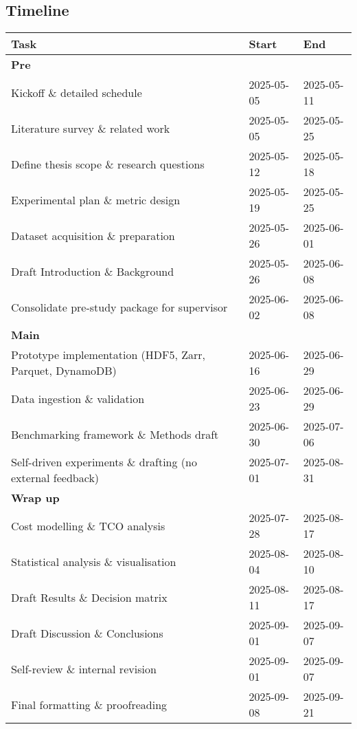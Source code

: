 \documentclass{article}
\begin{document}
\subsection{Timeline}
\begin{center}
\begingroup
\setlength{\tabcolsep}{8pt}
\small
\begin{tabular}{@{}lll@{}}
\toprule
\textbf{Task} & \textbf{Start} & \textbf{End} \\
\midrule
\multicolumn{3}{l}{\textbf{Pre}} \\
Kickoff \& detailed schedule & 2025-05-05 & 2025-05-11 \\
Literature survey \& related work & 2025-05-05 & 2025-05-25 \\
Define thesis scope \& research questions & 2025-05-12 & 2025-05-18 \\
Experimental plan \& metric design & 2025-05-19 & 2025-05-25 \\
Dataset acquisition \& preparation & 2025-05-26 & 2025-06-01 \\
Draft Introduction \& Background & 2025-05-26 & 2025-06-08 \\
Consolidate pre-study package for supervisor & 2025-06-02 & 2025-06-08 \\
\midrule
\multicolumn{3}{l}{\textbf{Main}} \\
Prototype implementation (HDF5, Zarr, Parquet, DynamoDB) & 2025-06-16 & 2025-06-29 \\
Data ingestion \& validation & 2025-06-23 & 2025-06-29 \\
Benchmarking framework \& Methods draft & 2025-06-30 & 2025-07-06 \\
Self-driven experiments \& drafting (no external feedback) & 2025-07-01 & 2025-08-31 \\
\midrule
\multicolumn{3}{l}{\textbf{Wrap up}} \\
Cost modelling \& TCO analysis & 2025-07-28 & 2025-08-17 \\
Statistical analysis \& visualisation & 2025-08-04 & 2025-08-10 \\
Draft Results \& Decision matrix & 2025-08-11 & 2025-08-17 \\
Draft Discussion \& Conclusions & 2025-09-01 & 2025-09-07 \\
Self-review \& internal revision & 2025-09-01 & 2025-09-07 \\
Final formatting \& proofreading & 2025-09-08 & 2025-09-21 \\
\bottomrule
\end{tabular}
\endgroup
\end{center}



\printbibliography
\end{document}
